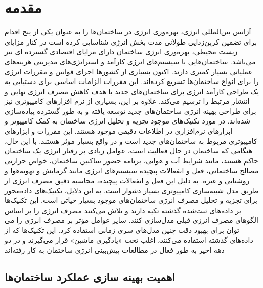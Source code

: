 \chapter{مقدمه}

آژانس بین‌المللی انرژی، بهره‌وری انرژی در ساختمان‌ها را به عنوان یکی از پنج اقدام برای تضمین کربن‌زدایی طولانی‌ مدت بخش انرژی شناسایی کرده است\cite{DEB2017902}
در کنار مزایای زیست محیطی، بهره‌وری انرژی ساختمان دارای مزایای اقتصادی گسترده ای نیز می‌باشد.
 ساختمان‌هایی با سیستم‌های انرژی کارآمد و استراتژی‌های مدیریتی هزینه‌های عملیاتی بسیار کمتری دارند. اکنون بسیاری از کشورها اجرای قوانین و مقررات انرژی را
 برای انواع ساختمان‌ها تسریع کرده‌اند. این مقررات الزامات اساسی برای دستیابی به یک طراحی کارآمد انرژی برای ساختمان‌های 
 جدید با هدف کاهش مصرف انرژی نهایی و انتشار  مرتبط را ترسیم می‌کند. 
 علاوه بر این، بسیاری از نرم افزارهای کامپیوتری نیز برای طراحی بهینه انرژی ساختمان‌های جدید توسعه یافته 
 و به طور گسترده پیاده‌سازی شده‌اند. در مورد تکنیک‌های موجود تجزیه و تحلیل انرژی ساختمان
  به کمک کامپیوتر و ابزارهای نرم‌افزاری در \cite{ALHOMOUD2001421, CRAWLEY2008661} اطلاعات دقیقی موجود هستند. این مقررات و ابزارهای کامپیوتری مربوط
   به ساختمان‌های جدید است و در واقع بسیار موثر هستند. با این حال، هنگامی که ساختمان در حال فعالیت است، عوامل زیادی بر رفتار
   انرژی یک ساختمان حاکم هستند، مانند شرایط آب و هوایی، برنامه حضور ساکنین ساختمان، خواص حرارتی مصالح ساختمانی، فعل و انفعالات پیچیده 
  سیستم‌های انرژی مانند گرمایش و تهویه‌هوا و روشنایی و غیره. به دلیل این فعل و انفعالات پیچیده،
   محاسبه دقیق مصرف انرژی از طریق مدل شبیه‌سازی کامپیوتری بسیار دشوار است. به این دلایل، تکنیک‌های داده‌محور برای تجزیه و تحلیل مصرف انرژی ساختمان‌های
   موجود بسیار حیاتی است. این تکنیک‌ها بر داده‌های ثبت‌شده گذشته تکیه دارند و
   تلاش می‌کنند مصرف انرژی را بر اساس الگوهای مصرف انرژی قبلی مدل‌سازی کنند. سایر عوامل مؤثر بر مصرف انرژی را می توان برای بهبود
    دقت چنین مدل‌های سری زمانی استفاده کرد. این تکنیک‌ها که از داده‌های گذشته استفاده می‌کنند،
    اغلب تحت «یادگیری ماشین» قرار می‌گیرند و در دو دهه اخیر به طور فعال در مطالعات پیش‌بینی انرژی ساختمان به کار رفته‌اند

\section[اهمیت بهینه سازی عملکرد ساختمان‌ها]{اهمیت بهینه سازی عملکرد ساختمان‌ها\cite{DEB2017902}}

